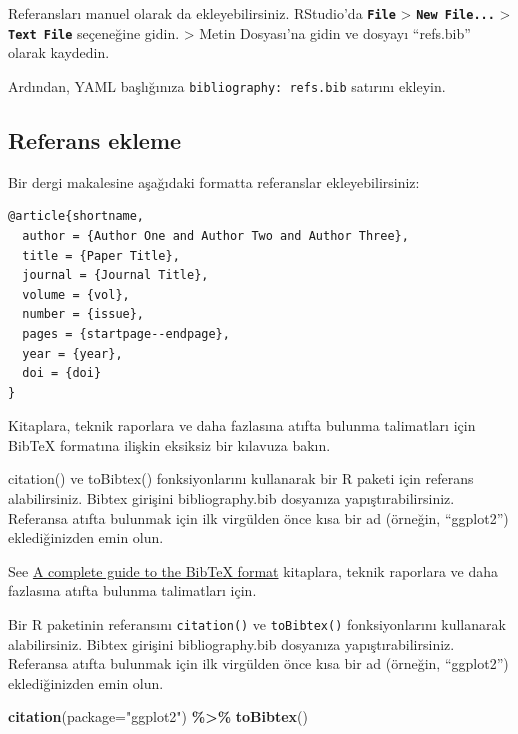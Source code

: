 \documentclass[
  oneside]{book}
\newenvironment{Shaded}{\begin{snugshade}}{\end{snugshade}}
\newcommand{\AttributeTok}[1]{\textcolor[rgb]{0.13,0.29,0.53}{#1}}
\newcommand{\FunctionTok}[1]{\textcolor[rgb]{0.13,0.29,0.53}{\textbf{#1}}}
\newcommand{\NormalTok}[1]{#1}
\newcommand{\SpecialCharTok}[1]{\textcolor[rgb]{0.81,0.36,0.00}{\textbf{#1}}}
\newcommand{\StringTok}[1]{\textcolor[rgb]{0.31,0.60,0.02}{#1}}
\begin{document}
Referansları manuel olarak da ekleyebilirsiniz. RStudio'da \textbf{\texttt{File}} \textgreater{} \textbf{\texttt{New\ File...}} \textgreater{} \textbf{\texttt{Text\ File}} seçeneğine gidin. \textgreater{} Metin Dosyası'na gidin ve dosyayı ``refs.bib'' olarak kaydedin.

Ardından, YAML başlığınıza \texttt{bibliography:\ refs.bib} satırını ekleyin.

\hypertarget{referans-ekleme}{%
\subsection{Referans ekleme}\label{referans-ekleme}}

Bir dergi makalesine aşağıdaki formatta referanslar ekleyebilirsiniz:

\begin{verbatim}
@article{shortname,
  author = {Author One and Author Two and Author Three},
  title = {Paper Title},
  journal = {Journal Title},
  volume = {vol},
  number = {issue},
  pages = {startpage--endpage},
  year = {year},
  doi = {doi}
}
\end{verbatim}

Kitaplara, teknik raporlara ve daha fazlasına atıfta bulunma talimatları için BibTeX formatına ilişkin eksiksiz bir kılavuza bakın.

citation() ve toBibtex() fonksiyonlarını kullanarak bir R paketi için referans alabilirsiniz. Bibtex girişini bibliography.bib dosyanıza yapıştırabilirsiniz. Referansa atıfta bulunmak için ilk virgülden önce kısa bir ad (örneğin, ``ggplot2'') eklediğinizden emin olun.

See \href{https://www.bibtex.com/g/bibtex-format/}{A complete guide to the BibTeX format} kitaplara, teknik raporlara ve daha fazlasına atıfta bulunma talimatları için.

Bir R paketinin referansını \texttt{citation()} ve \texttt{toBibtex()} fonksiyonlarını kullanarak alabilirsiniz. Bibtex girişini bibliography.bib dosyanıza yapıştırabilirsiniz. Referansa atıfta bulunmak için ilk virgülden önce kısa bir ad (örneğin, ``ggplot2'') eklediğinizden emin olun.

\begin{Shaded}
\begin{Highlighting}[]
\FunctionTok{citation}\NormalTok{(}\AttributeTok{package=}\StringTok{"ggplot2"}\NormalTok{) }\SpecialCharTok{\%\textgreater{}\%} \FunctionTok{toBibtex}\NormalTok{()}
\end{Highlighting}
\end{Shaded}
\end{document}
